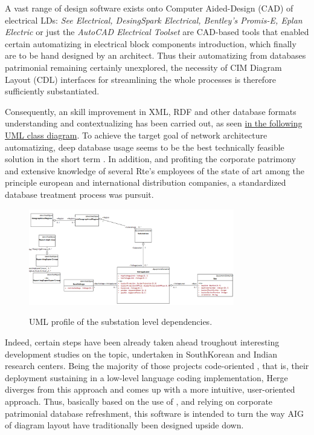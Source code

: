 A vast range of design software exists onto Computer Aided-Design (CAD) of electrical LDs: \textit{See Electrical, DesingSpark Electrical, Bentley's Promis-E, Eplan Electric} or just the \textit{AutoCAD Electrical Toolset} are CAD-based tools that enabled certain automatizing in electrical block components introduction, which finally are to be hand designed by an architect. Thus their automatizing from databases patrimonial remaining certainly unexplored, the necessity of CIM Diagram Layout (CDL) interfaces for streamlining the whole processes is therefore sufficiently substantiated.

Consequently, an skill improvement in XML, RDF and other database formats understanding and contextualizing has been carried out, as seen \hyperref[fig:UMLprofile]{in the following UML class diagram}. To achieve the target goal of network architecture automatizing, deep database usage seems to be the best technically feasible solution in the short term \cite{Automaticdescgeneration, CIMIEE, CIMDistribution}. In addition, and  profiting the corporate patrimony and extensive knowledge of several Rte's employees \cite{specif_detaillees_GAI, IEC-normative, Infos_GAI} of the state of art among the principle european and international distribution companies, a standardized database treatment process was pursuit.

\begin{figure}[h]
    \centering
    \parbox[t]{0.8\textwidth}{
    \centering
    {\includegraphics[width=0.8\textwidth]{0.figuras/UML_RTE_geographical_region.png}}
    \caption{UML profile of the substation level dependencies.}
    \label{fig:UMLprofile}}
\end{figure}

Indeed, certain steps have been already taken ahead troughout interesting development studies on the topic, undertaken in SouthKorean \cite{standard-based-SLD-AG} and Indian \cite{Distribution-feeder} research centers. Being the majority of those projects code-oriented \cite{Eyevision, CIMjava}, that is, their deployment sustaining in a low-level language coding implementation, Herge diverges from this approach and comes up with a more intuitive, user-oriented approach. Thus, basically based on the use of , and relying on corporate patrimonial database refreshment, this software is intended to turn the way AIG of diagram layout have traditionally been designed upside down. 

